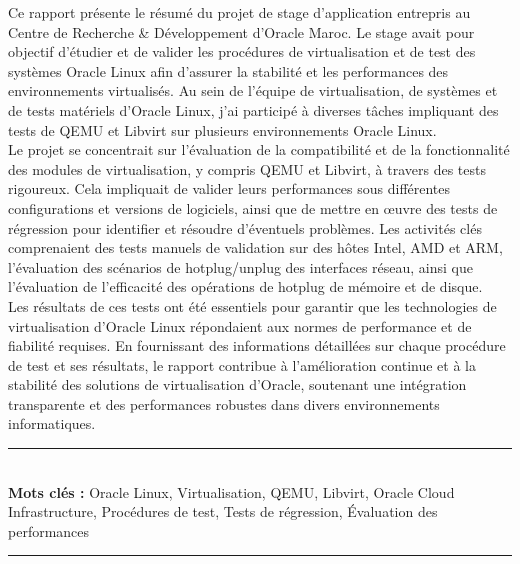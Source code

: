 
Ce rapport présente le résumé du projet de stage d'application entrepris au Centre de Recherche \& Développement d'Oracle Maroc. Le stage avait pour objectif d'étudier et de valider les procédures de virtualisation et de test des systèmes Oracle Linux afin d'assurer la stabilité et les performances des environnements virtualisés. Au sein de l'équipe de virtualisation, de systèmes et de tests matériels d'Oracle Linux, j'ai participé à diverses tâches impliquant des tests de QEMU et Libvirt sur plusieurs environnements Oracle Linux. \\

Le projet se concentrait sur l'évaluation de la compatibilité et de la fonctionnalité des modules de virtualisation, y compris QEMU et Libvirt, à travers des tests rigoureux. Cela impliquait de valider leurs performances sous différentes configurations et versions de logiciels, ainsi que de mettre en œuvre des tests de régression pour identifier et résoudre d'éventuels problèmes. Les activités clés comprenaient des tests manuels de validation sur des hôtes Intel, AMD et ARM, l'évaluation des scénarios de hotplug/unplug des interfaces réseau, ainsi que l'évaluation de l'efficacité des opérations de hotplug de mémoire et de disque. \\

Les résultats de ces tests ont été essentiels pour garantir que les technologies de virtualisation d'Oracle Linux répondaient aux normes de performance et de fiabilité requises. En fournissant des informations détaillées sur chaque procédure de test et ses résultats, le rapport contribue à l'amélioration continue et à la stabilité des solutions de virtualisation d'Oracle, soutenant une intégration transparente et des performances robustes dans divers environnements informatiques.
\bigskip

\noindent\rule{\linewidth}{0.3mm} \\[0.6cm] 
\textbf{Mots clés :}
Oracle Linux, Virtualisation, QEMU, Libvirt, Oracle Cloud Infrastructure, Procédures de test, Tests de régression, Évaluation des performances
\\
\noindent\rule{\linewidth}{0.3mm} \\[0.6cm] 
